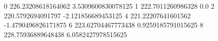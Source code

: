 0 226.23208618164062 3.5309600830078125
1 222.7011260986328 0.0
2 220.5792694091797 -2.121856689453125
4 221.22207641601562 -1.4790496826171875
6 223.62704467773438 0.9259185791015625
8 228.75936889648438 6.0582427978515625
